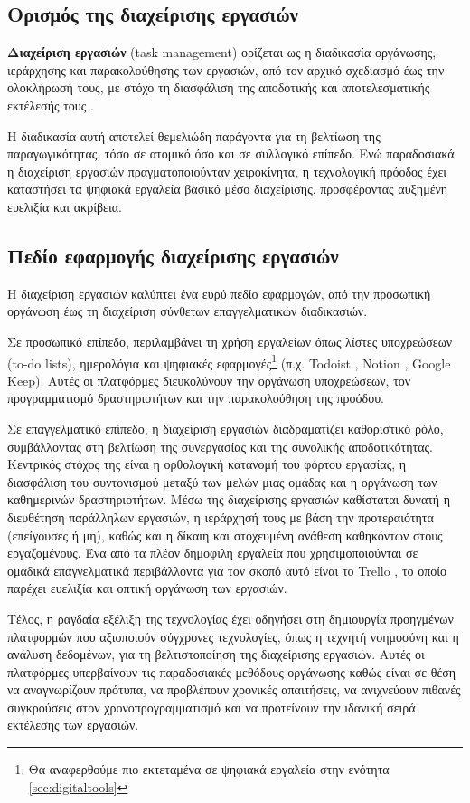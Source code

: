         \subsection{Ορισμός της διαχείρισης εργασιών}
            \textbf{Διαχείριση εργασιών} (task management) ορίζεται ως η διαδικασία οργάνωσης, ιεράρχησης και παρακολούθησης των εργασιών, από τον αρχικό σχεδιασμό έως την ολοκλήρωσή τους, με στόχο τη διασφάλιση της αποδοτικής και αποτελεσματικής εκτέλεσής τους \cite{PMBOK}.

            Η διαδικασία αυτή αποτελεί θεμελιώδη παράγοντα για τη βελτίωση της παραγωγικότητας, τόσο σε ατομικό όσο και σε συλλογικό επίπεδο. Ενώ παραδοσιακά η διαχείριση εργασιών πραγματοποιούνταν χειροκίνητα, η τεχνολογική πρόοδος έχει καταστήσει τα ψηφιακά εργαλεία βασικό μέσο διαχείρισης, προσφέροντας αυξημένη ευελιξία και ακρίβεια.

        \subsection{Πεδίο εφαρμογής διαχείρισης εργασιών}
            Η διαχείριση εργασιών καλύπτει ένα ευρύ πεδίο εφαρμογών, από την προσωπική οργάνωση έως τη διαχείριση σύνθετων επαγγελματικών διαδικασιών.

            Σε προσωπικό επίπεδο, περιλαμβάνει τη χρήση εργαλείων όπως λίστες υποχρεώσεων (to-do lists), ημερολόγια και ψηφιακές εφαρμογές\footnote{Θα αναφερθούμε πιο εκτεταμένα σε ψηφιακά εργαλεία στην ενότητα \ref{sec:digitaltools}} (π.χ. Todoist \cite{Todoist}, Notion \cite{Notion}, Google Keep). Αυτές οι πλατφόρμες διευκολύνουν την οργάνωση υποχρεώσεων, τον προγραμματισμό δραστηριοτήτων και την παρακολούθηση της προόδου.

            Σε επαγγελματικό επίπεδο, η διαχείριση εργασιών διαδραματίζει καθοριστικό ρόλο, συμβάλλοντας στη βελτίωση της συνεργασίας και της συνολικής αποδοτικότητας. Κεντρικός στόχος της είναι η ορθολογική κατανομή του φόρτου εργασίας, η διασφάλιση του συντονισμού μεταξύ των μελών μιας ομάδας και η οργάνωση των καθημερινών δραστηριοτήτων.  Μέσω της διαχείρισης εργασιών καθίσταται δυνατή η διευθέτηση παράλληλων εργασιών, η ιεράρχησή τους με βάση την προτεραιότητα (επείγουσες ή μη), καθώς και η δίκαιη και στοχευμένη ανάθεση καθηκόντων στους εργαζομένους. Ένα από τα πλέον δημοφιλή εργαλεία που χρησιμοποιούνται σε ομαδικά επαγγελματικά περιβάλλοντα για τον σκοπό αυτό είναι το Trello \cite{Trello}, το οποίο παρέχει ευελιξία και οπτική οργάνωση των εργασιών.

            Τέλος, η ραγδαία εξέλιξη της τεχνολογίας έχει οδηγήσει στη δημιουργία προηγμένων πλατφορμών που αξιοποιούν σύγχρονες τεχνολογίες, όπως η τεχνητή νοημοσύνη και η ανάλυση δεδομένων, για τη βελτιστοποίηση της διαχείρισης εργασιών. Αυτές οι πλατφόρμες υπερβαίνουν τις παραδοσιακές μεθόδους οργάνωσης καθώς είναι σε θέση να αναγνωρίζουν πρότυπα, να προβλέπουν χρονικές απαιτήσεις, να ανιχνεύουν πιθανές συγκρούσεις στον χρονοπρογραμματισμό και να προτείνουν την ιδανική σειρά εκτέλεσης των εργασιών.

